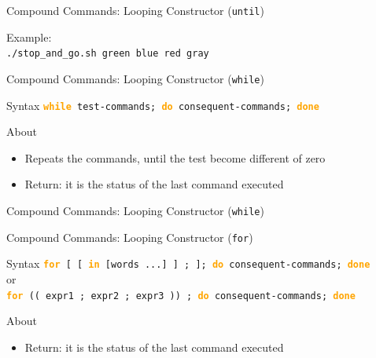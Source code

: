 \documentclass[10pt, compress, aspectratio=169]{beamer}
\begin{document}
\begin{frame}{Compound Commands: Looping Constructor (\texttt{until})}
  
  Example: \\
  \texttt{./stop\_and\_go.sh green blue red gray}
\end{frame}

\begin{frame}{Compound Commands: Looping Constructor (\texttt{while})}
  \begin{alertblock}{Syntax}
    \texttt{\textbf{\textcolor{orange}{while}} test-commands;
            \textbf{\textcolor{orange}{do}}
            consequent-commands; \textbf{\textcolor{orange}{done}}}
  \end{alertblock}
  \begin{exampleblock}{About}
    \begin{itemize}
      \item Repeats the commands, until the test become different of zero
      \item Return: it is the status of the last command executed
    \end{itemize}
  \end{exampleblock}
\end{frame}

\begin{frame}{Compound Commands: Looping Constructor (\texttt{while})}
  
\end{frame}

\begin{frame}{Compound Commands: Looping Constructor (\texttt{for})}
  \begin{alertblock}{Syntax}
    \texttt{\textbf{\textcolor{orange}{for}} [ [ \textbf{\textcolor{orange}{in}}
            [words ...] ] ; ];
            \textbf{\textcolor{orange}{do}}
            consequent-commands; \textbf{\textcolor{orange}{done}}}
    \\
    or
    \\
    \texttt{\textbf{\textcolor{orange}{for}}
            (( expr1 ; expr2 ; expr3  )) ;
            \textbf{\textcolor{orange}{do}}
            consequent-commands; \textbf{\textcolor{orange}{done}}}
  \end{alertblock}
  \begin{exampleblock}{About}
    \begin{itemize}
      \item Return: it is the status of the last command executed
    \end{itemize}
  \end{exampleblock}
\end{frame}
\end{document}
